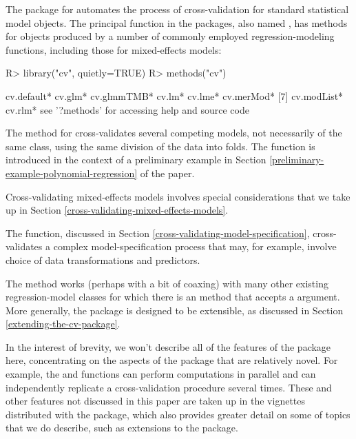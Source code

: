 \documentclass[
]{jss}
\begin{document}
The  package for  automates the process of
cross-validation for standard  statistical model objects.
The principal function in the packages, also named , has
methods for objects produced by a number of commonly employed
regression-modeling functions, including those for mixed-effects models:

\begin{CodeChunk}
\begin{CodeInput}
R> library("cv", quietly=TRUE)
R> methods("cv")
\end{CodeInput}
\begin{CodeOutput}
[1] cv.default* cv.glm*     cv.glmmTMB* cv.lm*      cv.lme*     cv.merMod* 
[7] cv.modList* cv.rlm*    
see '?methods' for accessing help and source code
\end{CodeOutput}
\end{CodeChunk}

The  method for  cross-validates several
competing models, not necessarily of the same class, using the same
division of the data into folds. The  function is introduced
in the context of a preliminary example in Section
\ref{preliminary-example-polynomial-regression} of the paper.

Cross-validating mixed-effects models involves special considerations
that we take up in Section \ref{cross-validating-mixed-effects-models}.

The  function, discussed in Section
\ref{cross-validating-model-specification}, cross-validates a complex
model-specification process that may, for example, involve choice of
data transformations and predictors.

The   method works (perhaps with a bit of
coaxing) with many other existing regression-model classes for which
there is an  method that accepts a  argument.
More generally, the  package is designed to be extensible, as
discussed in Section \ref{extending-the-cv-package}.

In the interest of brevity, we won't describe all of the features of the
 package here, concentrating on the aspects of the package that
are relatively novel. For example, the  and 
functions can perform computations in parallel and can independently
replicate a cross-validation procedure several times. These and other
features not discussed in this paper are taken up in the vignettes
distributed with the package, which also provides greater detail on some
of topics that we do describe, such as extensions to the package.
\end{document}
